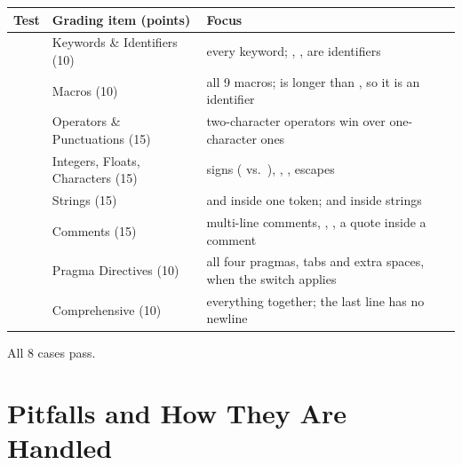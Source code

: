 \documentclass[12pt]{article}
\begin{document}
\begin{center}
\begin{tabularx}{\linewidth}{@{}lP{4.4cm}L@{}}
\toprule
Test & Grading item (points) & Focus \\
\midrule
{} & Keywords \& Identifiers (10) & every keyword; , ,  are identifiers \\
 & Macros (10) & all 9 macros;  is longer than , so it is an identifier \\
 & Operators \& Punctuations (15) & two-character operators win over one-character ones \\
 & Integers, Floats, Characters (15) & signs ( vs.\ ), , , escapes \\
 & Strings (15) & \code{\"} and \code{\n} inside one token; \code{//} and \code{/*} inside strings \\
 & Comments (15) & multi-line comments, \code{**}, \code{/**/}, a quote inside a comment \\
 & Pragma Directives (10) & all four pragmas, tabs and extra spaces, when the switch applies \\
 & Comprehensive (10) & everything together; the last line has no newline \\
\bottomrule
\end{tabularx}
\end{center}

All 8 cases pass.

\section{Pitfalls and How They Are Handled}
\label{sec:diff}
\end{document}
